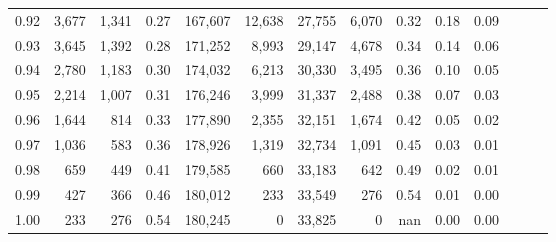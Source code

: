 \begin{tabular}{rrrrrrrrrrrrrr}
0.92 &  3,677 &  1,341 &  0.27 &  167,607 &   12,638 &  27,755 &   6,070 &  0.32 &  0.18 &      0.09 \\
0.93 &  3,645 &  1,392 &  0.28 &  171,252 &    8,993 &  29,147 &   4,678 &  0.34 &  0.14 &      0.06 \\
0.94 &  2,780 &  1,183 &  0.30 &  174,032 &    6,213 &  30,330 &   3,495 &  0.36 &  0.10 &      0.05 \\
0.95 &  2,214 &  1,007 &  0.31 &  176,246 &    3,999 &  31,337 &   2,488 &  0.38 &  0.07 &      0.03 \\
0.96 &  1,644 &    814 &  0.33 &  177,890 &    2,355 &  32,151 &   1,674 &  0.42 &  0.05 &      0.02 \\
0.97 &  1,036 &    583 &  0.36 &  178,926 &    1,319 &  32,734 &   1,091 &  0.45 &  0.03 &      0.01 \\
0.98 &    659 &    449 &  0.41 &  179,585 &      660 &  33,183 &     642 &  0.49 &  0.02 &      0.01 \\
0.99 &    427 &    366 &  0.46 &  180,012 &      233 &  33,549 &     276 &  0.54 &  0.01 &      0.00 \\
1.00 &    233 &    276 &  0.54 &  180,245 &        0 &  33,825 &       0 &   nan &  0.00 &      0.00 \\
\bottomrule
\end{tabular}
